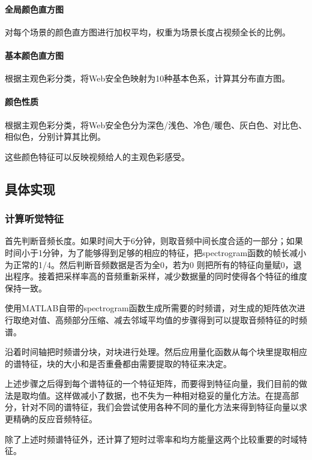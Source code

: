 \documentclass{article}
\begin{document}
\begin{multicols}{2}
                \paragraph{全局颜色直方图}
                对每个场景的颜色直方图进行加权平均，权重为场景长度占视频全长的比例。

                \paragraph{基本颜色直方图}
                根据主观色彩分类，将Web安全色映射为10种基本色系，计算其分布直方图。

                \paragraph{颜色性质}
                根据主观色彩分类，将Web安全色分为深色/浅色、冷色/暖色、灰白色、对比色、相似色，分别计算其比例。

                这些颜色特征可以反映视频给人的主观色彩感受。

        \subsection{具体实现}
            \subsubsection{计算听觉特征}
                首先判断音频长度。如果时间大于6分钟，则取音频中间长度合适的一部分；如果时间小于1分钟，为了能够得到足够的相应的特征，把spectrogram函数的帧长减小为正常的1/4。然后判断音频数据是否为全0，若为0 则把所有的特征向量赋0，退出程序。接着把采样率高的音频重新采样，减少数据量的同时使得各个特征的维度保持一致。

                使用MATLAB自带的spectrogram函数生成所需要的时频谱，对生成的矩阵依次进行取绝对值、高频部分压缩、减去邻域平均值的步骤得到可以提取音频特征的时频谱。

                沿着时间轴把时频谱分块，对块进行处理。然后应用量化函数从每个块里提取相应的谱特征，块的大小和是否重叠都由需要提取的特征来决定。

                上述步骤之后得到每个谱特征的一个特征矩阵，而要得到特征向量，我们目前的做法是取均值。这样做减小了数据，也不失为一种相对稳妥的量化方法。在提高部分，针对不同的谱特征，我们会尝试使用各种不同的量化方法来得到特征向量以求更精确的反应音频特征。

                除了上述时频谱特征外，还计算了短时过零率和均方能量这两个比较重要的时域特征。


\end{multicols}
\end{document}
